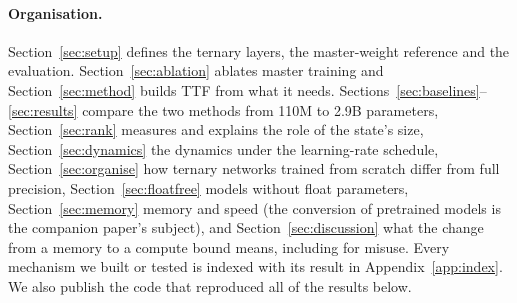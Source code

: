 \documentclass[10pt,twocolumn]{article}
\begin{document}
\paragraph{Organisation.} Section~\ref{sec:setup} defines the ternary layers, the master-weight reference and the
evaluation. Section~\ref{sec:ablation} ablates master training and Section~\ref{sec:method} builds TTF from what it needs.
Sections~\ref{sec:baselines}--\ref{sec:results} compare the two methods from 110M to 2.9B parameters,
Section~\ref{sec:rank} measures and explains the role of the state's size, Section~\ref{sec:dynamics} the dynamics under
the learning-rate schedule, Section~\ref{sec:organise} how ternary networks trained from scratch differ from full
precision, Section~\ref{sec:floatfree} models without float parameters, Section~\ref{sec:memory}
memory and speed (the conversion of pretrained models is the companion paper's subject), and Section~\ref{sec:discussion}
what the change from a memory to a compute bound means, including for misuse. Every mechanism we built or tested
is indexed with its result in Appendix~\ref{app:index}. We also publish the code that reproduced all of the results below.
\end{document}

